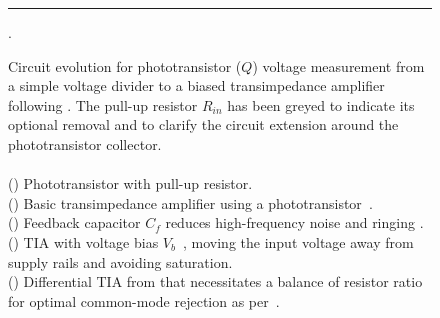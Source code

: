 \begin{figure}
    \centering
    \begin{subfigure}[t]{0.19\textwidth}
        \VDIV[0.9]
        \caption{}
        \label{fig:volt-div}
    \end{subfigure}
    \begin{subfigure}[t]{0.39\textwidth}
        \TIABASIC[0.9]
        \caption{}
        \label{fig:tia-basic}
    \end{subfigure}
    \begin{subfigure}[t]{0.39\textwidth}
        \TIACF[0.9]
        \caption{}
        \label{fig:tia-cf}
    \end{subfigure}

    \vspace{0.5cm}
    \noindent\rule{\textwidth}{0.4pt}
    \vspace{0.5cm}

    \begin{subfigure}[t]{0.45\textwidth}
        \TIAVB[0.9]
        \caption{}
        \label{fig:tia-vb}
        \label{fig:tia-bias}
    \end{subfigure}
    \begin{subfigure}[t]{0.45\textwidth}
        \TIAFULL[0.9]
        \caption{}
        \label{fig:tia-full}
        \label{fig:tia-diff}
        \label{fig:general-tia}
    \end{subfigure}
    \centering
    \caption[Circuit evolution for phototransistor voltage measurement]{Circuit evolution for phototransistor ($Q$) voltage measurement from a
        simple voltage divider to a biased transimpedance amplifier following \textcite{mcpherson_portable_2013}. The pull-up resistor $R_{in}$ has been greyed to indicate its optional removal and to clarify the circuit extension around the phototransistor collector.\\\\
        () Phototransistor with pull-up resistor.\\
        () Basic transimpedance amplifier using a phototransistor~\cite[Fig.~4.22]{horowitz_art_2015}.\\
        () Feedback capacitor $C_f$ reduces high-frequency noise and ringing \cite[p. 283]{horowitz_art_2020}.\\
        () TIA with voltage bias $V_b$~\cite{pardue_near_2013}, moving the input voltage away from supply rails and avoiding saturation.\\
        () Differential TIA from \textcite[Fig. 3]{mcpherson_portable_2013} that necessitates a balance of resistor ratio for optimal common-mode rejection as per~\textcite[p.\ 227]{horowitz_art_2015}.}.
    \label{fig:tia-evolution}
\end{figure}

